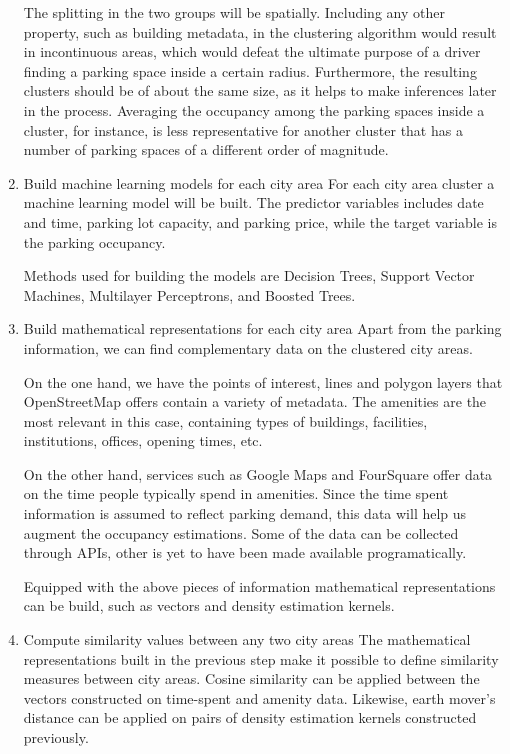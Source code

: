 \documentclass{article}
\begin{document}
\begin{enumerate}[label=\Roman*]
		The splitting in the two groups will be spatially. Including any other property, such as building metadata, in the clustering algorithm would result in incontinuous areas, which would defeat the ultimate purpose of a driver finding a parking space inside a certain radius. Furthermore, the resulting clusters should be of about the same size, as it helps to make inferences later in the process. Averaging the occupancy among the parking spaces inside a cluster, for instance, is less representative for another cluster that has a number of parking spaces of a different order of magnitude.		
		
		\item{Build machine learning models for each city area}
		For each city area cluster a machine learning model will be built. The predictor variables includes date and time, parking lot capacity, and parking price, while the target variable is the parking occupancy. 
		
		Methods used for building the models are Decision Trees, Support Vector Machines, Multilayer Perceptrons, and Boosted Trees.
		
		\item{Build mathematical representations for each city area}
		Apart from the parking information, we can find complementary data on the clustered city areas. 
		
		On the one hand, we have the points of interest, lines and polygon layers that OpenStreetMap offers contain a variety of metadata. The amenities are the most relevant in this case, containing types of buildings, facilities, institutions, offices, opening times, etc. 
		
		On the other hand, services such as Google Maps and FourSquare offer data on the time people typically spend in amenities. Since the time spent information is assumed to reflect parking demand, this data will help us augment the occupancy estimations. Some of the data can be collected through APIs, other is yet to have been made available programatically.  
	
		Equipped with the above pieces of information mathematical representations can be build, such as vectors and density estimation kernels.  		
				
		\item{Compute similarity values between any two city areas}
		The mathematical representations built in the previous step make it possible to define similarity measures between city areas. Cosine similarity can be applied between the vectors constructed on time-spent and amenity data. Likewise, earth mover's distance can be applied on pairs of density estimation kernels constructed previously.
		

\end{enumerate}
\end{document}
